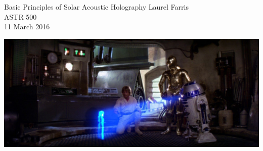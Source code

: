 \documentclass{beamer}
\begin{document}
\begin{frame}
    \begin{centering}
    {\Large Basic Principles of Solar Acoustic Holography}
    {\large\textcolor{cblue}{Laurel Farris}}\\
    {\large\textcolor{cblue}{ASTR 500}}\\
    {\textcolor{cblue}{11 March 2016}}\\
    \end{centering}
    \vspace{1cm}
    \includegraphics[width=\paperwidth]{starwars.jpg}
\end{frame}
\end{document}
